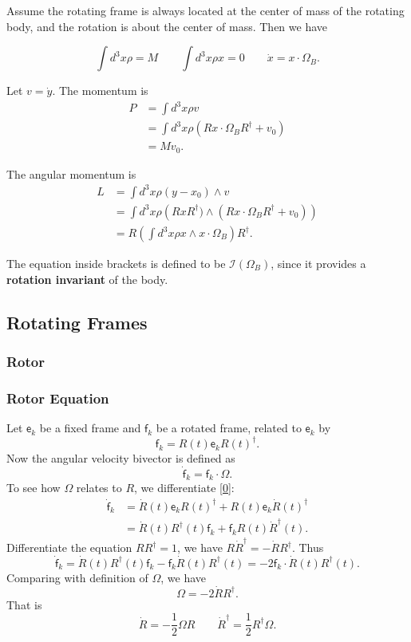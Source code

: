 Assume the rotating frame is always located at the center of mass of the rotating body, and the rotation is about the center of mass. Then we have

\[
	\int d^3 x \rho = M \qquad \int d^3 x \rho x = 0 \qquad \dot x = x \cdot \Omega_B
.\] 

Let $v = \dot y$. The momentum is 
\begin{align*}
	P &= \int d^3 x \rho  v \\
	&= \int d^3 x \rho \left( R x \cdot \Omega_B R^\dag + v_0 \right)  \\
	&= M v_0
.\end{align*}

The angular momentum is
\begin{align*}
	L &= \int d^3 x \rho(y - x_0) \wedge v \\
	&= \int d^3 x \rho \left( R x R^\dag) \wedge \left( R x \cdot \Omega_B R^\dag + v_0 \right)  \right)  \\
	&= R \left( \int d^3 x \rho x \wedge x \cdot \Omega_B \right)R^\dag
.\end{align*}

The equation inside brackets is defined to be $\mathcal{I}(\Omega_B)$, since it provides a \textbf{rotation invariant} of the body.

\subsection{Rotating Frames}

\subsubsection{Rotor}

\subsubsection{Rotor Equation}

Let $\mathsf{e}_k$ be a fixed frame and $\mathsf{f}_k$ be a rotated frame, related to $\mathsf{e}_k$ by 
\begin{equation}
	\label{0}
	\mathsf{f}_k = R(t) \mathsf{e}_k R(t)^\dag.
\end{equation}
Now the angular velocity bivector is defined as
\[
	\dot{\mathsf{f}}_k = \mathsf{f}_k \cdot \Omega
.\] 
To see how $\Omega$ relates to $R$, we differentiate \eqref{0}:
\begin{align*}
	\dot{\mathsf{f}}_k &= \dot{R}(t) \mathsf{e}_k R(t)^\dag + R(t) \mathsf{e}_k \dot{R}(t)^\dag\\
	&= \dot{R}(t) R^{\dag} (t) \mathsf{f}_k + \mathsf{f}_k R(t) \dot{R}^{\dag} (t)
.\end{align*} 
Differentiate the equation $R R^{\dag}  = 1$, we have $R \dot{R}^\dag = - \dot{R} R^{\dag} $. Thus
\[
	\dot{\mathsf{f}}_k = \dot{R}(t) R^{\dag} (t) \mathsf{f}_k - \mathsf{f}_k \dot{R}(t) R^{\dag} (t)
	= - 2 \mathsf{f}_k \cdot \dot{R}(t) R^{\dag} (t) 
.\] 
Comparing with definition of $\Omega$, we have
\[
	\Omega = - 2\dot{R} R^{\dag} 
.\] 
That is
\begin{equation}
	\label{4}
	\dot R = - \frac{1}{2} \Omega R \qquad \dot R^\dag = \frac{1}{2} R^\dag \Omega
.\end{equation} 

